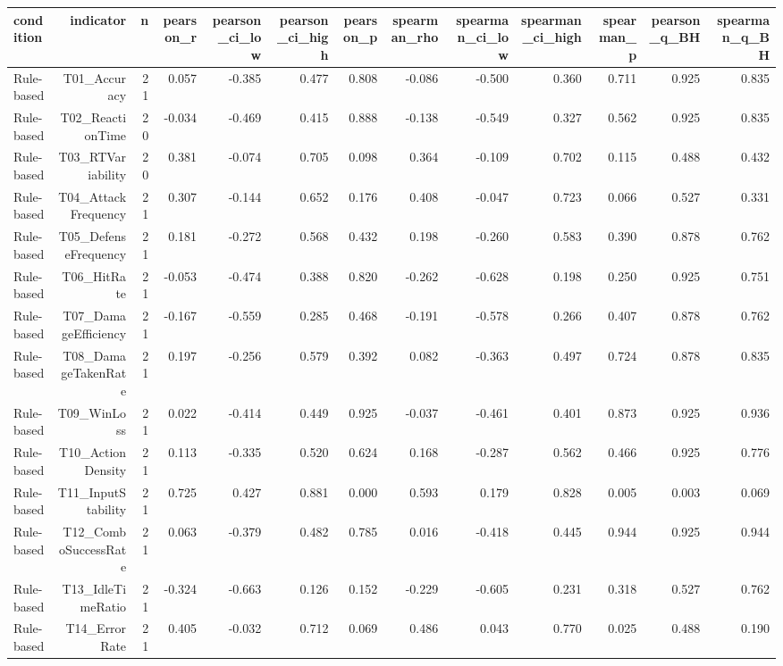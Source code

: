 \documentclass[10pt]{article}
\begin{document}
{\scriptsize\setlength{\tabcolsep}{3pt}\begin{longtable}{lrrrrrrrrrrrr}
\toprule
condition & indicator & n & pearson\_r & pearson\_ci\_low & pearson\_ci\_high & pearson\_p & spearman\_rho & spearman\_ci\_low & spearman\_ci\_high & spearman\_p & pearson\_q\_BH & spearman\_q\_BH \\
\midrule
\endhead
Rule-based & T01\_Accuracy & 21 & 0.057 & -0.385 & 0.477 & 0.808 & -0.086 & -0.500 & 0.360 & 0.711 & 0.925 & 0.835 \\
Rule-based & T02\_ReactionTime & 20 & -0.034 & -0.469 & 0.415 & 0.888 & -0.138 & -0.549 & 0.327 & 0.562 & 0.925 & 0.835 \\
Rule-based & T03\_RTVariability & 20 & 0.381 & -0.074 & 0.705 & 0.098 & 0.364 & -0.109 & 0.702 & 0.115 & 0.488 & 0.432 \\
Rule-based & T04\_AttackFrequency & 21 & 0.307 & -0.144 & 0.652 & 0.176 & 0.408 & -0.047 & 0.723 & 0.066 & 0.527 & 0.331 \\
Rule-based & T05\_DefenseFrequency & 21 & 0.181 & -0.272 & 0.568 & 0.432 & 0.198 & -0.260 & 0.583 & 0.390 & 0.878 & 0.762 \\
Rule-based & T06\_HitRate & 21 & -0.053 & -0.474 & 0.388 & 0.820 & -0.262 & -0.628 & 0.198 & 0.250 & 0.925 & 0.751 \\
Rule-based & T07\_DamageEfficiency & 21 & -0.167 & -0.559 & 0.285 & 0.468 & -0.191 & -0.578 & 0.266 & 0.407 & 0.878 & 0.762 \\
Rule-based & T08\_DamageTakenRate & 21 & 0.197 & -0.256 & 0.579 & 0.392 & 0.082 & -0.363 & 0.497 & 0.724 & 0.878 & 0.835 \\
Rule-based & T09\_WinLoss & 21 & 0.022 & -0.414 & 0.449 & 0.925 & -0.037 & -0.461 & 0.401 & 0.873 & 0.925 & 0.936 \\
Rule-based & T10\_ActionDensity & 21 & 0.113 & -0.335 & 0.520 & 0.624 & 0.168 & -0.287 & 0.562 & 0.466 & 0.925 & 0.776 \\
Rule-based & T11\_InputStability & 21 & 0.725 & 0.427 & 0.881 & 0.000 & 0.593 & 0.179 & 0.828 & 0.005 & 0.003 & 0.069 \\
Rule-based & T12\_ComboSuccessRate & 21 & 0.063 & -0.379 & 0.482 & 0.785 & 0.016 & -0.418 & 0.445 & 0.944 & 0.925 & 0.944 \\
Rule-based & T13\_IdleTimeRatio & 21 & -0.324 & -0.663 & 0.126 & 0.152 & -0.229 & -0.605 & 0.231 & 0.318 & 0.527 & 0.762 \\
Rule-based & T14\_ErrorRate & 21 & 0.405 & -0.032 & 0.712 & 0.069 & 0.486 & 0.043 & 0.770 & 0.025 & 0.488 & 0.190 \\

\end{longtable}}
\end{document}
